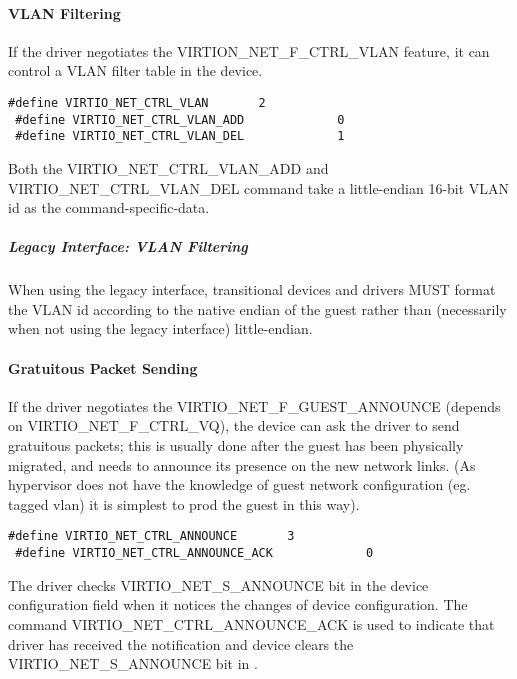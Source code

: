 \paragraph{VLAN Filtering}\label{sec:Device Types / Network Device / Device Operation / Control Virtqueue / VLAN Filtering}

If the driver negotiates the VIRTION_NET_F_CTRL_VLAN feature, it
can control a VLAN filter table in the device.

\begin{lstlisting}
#define VIRTIO_NET_CTRL_VLAN       2
 #define VIRTIO_NET_CTRL_VLAN_ADD             0
 #define VIRTIO_NET_CTRL_VLAN_DEL             1
\end{lstlisting}

Both the VIRTIO_NET_CTRL_VLAN_ADD and VIRTIO_NET_CTRL_VLAN_DEL
command take a little-endian 16-bit VLAN id as the command-specific-data.

\subparagraph{Legacy Interface: VLAN Filtering}\label{sec:Device Types / Network Device / Device Operation / Control Virtqueue / VLAN Filtering / Legacy Interface: VLAN Filtering}
When using the legacy interface, transitional devices and drivers
MUST format the VLAN id
according to the native endian of the guest rather than
(necessarily when not using the legacy interface) little-endian.

\paragraph{Gratuitous Packet Sending}\label{sec:Device Types / Network Device / Device Operation / Control Virtqueue / Gratuitous Packet Sending}

If the driver negotiates the VIRTIO_NET_F_GUEST_ANNOUNCE (depends
on VIRTIO_NET_F_CTRL_VQ), the device can ask the driver to send gratuitous
packets; this is usually done after the guest has been physically
migrated, and needs to announce its presence on the new network
links. (As hypervisor does not have the knowledge of guest
network configuration (eg. tagged vlan) it is simplest to prod
the guest in this way).

\begin{lstlisting}
#define VIRTIO_NET_CTRL_ANNOUNCE       3
 #define VIRTIO_NET_CTRL_ANNOUNCE_ACK             0
\end{lstlisting}

The driver checks VIRTIO_NET_S_ANNOUNCE bit in the device configuration  field
when it notices the changes of device configuration. The
command VIRTIO_NET_CTRL_ANNOUNCE_ACK is used to indicate that
driver has received the notification and device clears the
VIRTIO_NET_S_ANNOUNCE bit in .


